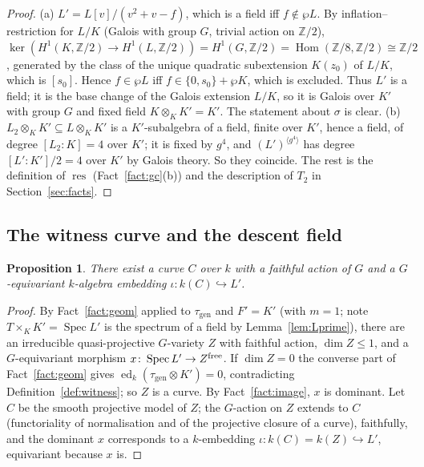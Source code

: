 \documentclass[11pt]{amsart}
\newtheorem{proposition}[theorem]{Proposition}
\theoremstyle{definition}
\theoremstyle{remark}
\newcommand{\ed}{\operatorname{ed}}
\newcommand{\gen}{\mathrm{gen}}
\newcommand{\Z}{\mathbb Z}
\newcommand{\res}{\operatorname{res}}
\newcommand{\Hom}{\operatorname{Hom}}
\newcommand{\Spec}{\operatorname{Spec}}
\begin{document}
\begin{proof}
(a) $L'=L[v]/(v^2+v-f)$, which is a field iff $f\notin\wp L$. By inflation--restriction
for $L/K$ (Galois with group $G$, trivial action on $\Z/2$),
$\ker(H^1(K,\Z/2)\to H^1(L,\Z/2))=H^1(G,\Z/2)=\Hom(\Z/8,\Z/2)\cong\Z/2$, generated by the
class of the unique quadratic subextension $K(z_0)$ of $L/K$, which is $[s_0]$. Hence
$f\in\wp L$ iff $f\in\{0,s_0\}+\wp K$, which is excluded. Thus $L'$ is a field; it is the
base change of the Galois extension $L/K$, so it is Galois over $K'$ with group $G$ and
fixed field $K\otimes_KK'=K'$. The statement about $\sigma$ is clear.
(b) $L_2\otimes_KK'\subseteq L\otimes_KK'$ is a $K'$-subalgebra of a field, finite over
$K'$, hence a field, of degree $[L_2:K]=4$ over $K'$; it is fixed by $g^4$, and
$(L')^{\langle g^4\rangle}$ has degree $[L':K']/2=4$ over $K'$ by Galois theory. So they
coincide. The rest is the definition of $\res$ (Fact~\ref{fact:gc}(b)) and the
description of $T_2$ in Section~\ref{sec:facts}.
\end{proof}

\subsection{The witness curve and the descent field}

\begin{proposition}\label{prop:curve}
There exist a curve $C$ over $k$ with a faithful action of $G$ and a $G$-equivariant
$k$-algebra embedding $\iota\colon k(C)\hookrightarrow L'$.
\end{proposition}

\begin{proof}
By Fact~\ref{fact:geom} applied to $\tau_{\gen}$ and $F'=K'$ (with $m=1$; note
$T\times_KK'=\Spec L'$ is the spectrum of a field by Lemma~\ref{lem:Lprime}), there are
an irreducible quasi-projective $G$-variety $Z$ with faithful action, $\dim Z\le1$, and a
$G$-equivariant morphism $x\colon\Spec L'\to Z^{\rm free}$. If $\dim Z=0$ the converse
part of Fact~\ref{fact:geom} gives $\ed_k(\tau_{\gen}\otimes K')=0$, contradicting
Definition~\ref{def:witness}; so $Z$ is a curve. By Fact~\ref{fact:image}, $x$ is
dominant. Let $C$ be the smooth projective model of $Z$; the $G$-action on $Z$ extends to
$C$ (functoriality of normalisation and of the projective closure of a curve), faithfully,
and the dominant $x$ corresponds to a $k$-embedding $\iota\colon k(C)=k(Z)\hookrightarrow L'$,
equivariant because $x$ is.
\end{proof}
\end{document}
